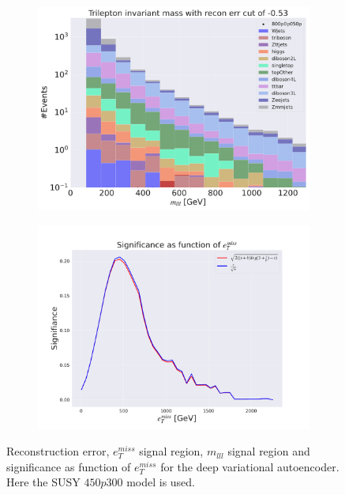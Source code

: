 \begin{figure}[H]
    \hfill
    \begin{subfigure}{.40\textwidth}
        \includegraphics[width=\textwidth]{Figures/VAE_testing/big/3lep/b_data_recon_big_rm3_feats_sig_800p0p050p_mlll_recon_errcut_-0.53.pdf}
        \caption{}
        \label{fig:VAE_3lep_big_mlll_800_3}
    \end{subfigure}
    \hfill   
    \begin{subfigure}{.40\textwidth}
        \includegraphics[width=\textwidth]{Figures/VAE_testing/big/3lep/significance_etmiss_800p0p050p_-0.529426176908041.pdf}
        \caption{}
        \label{fig:VAE_3lep_big_signi_800_3}
    \end{subfigure}
    \hfill      
    \caption[3lep deep network | $800p50$ | VAE | 3]{Reconstruction error, $e_T^{miss}$ signal region, $m_{lll}$ signal region and significance as function of 
    $e_T^{miss}$ for the deep variational autoencoder. Here the SUSY $450p300$ model is used.}
    \label{fig:VAE_3lep_big_rec_sig_signi_800_3}
\end{figure}

